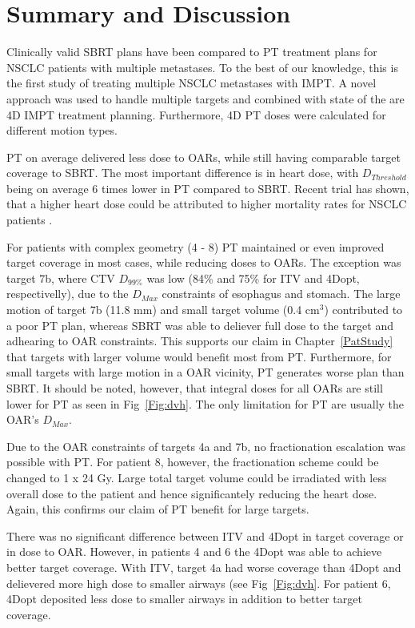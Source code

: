 \documentclass[type=dr, dr=rernat, accentcolor=tud7b,colorbacktitle, bigchapter, openright, twoside, 12pt ]{tudthesis}
\begin{document}
\section{Summary and Discussion}

Clinically valid SBRT plans have been compared to PT treatment plans for NSCLC patients with multiple metastases. 
To the best of our knowledge, this is the first study of treating multiple NSCLC metastases with IMPT. A novel approach was used to handle multiple targets and combined
with state of the are 4D IMPT treatment planning. Furthermore, 4D PT doses were calculated for different motion types. 

PT on average delivered less dose to OARs, while still having comparable target coverage to SBRT.
The most important difference is in heart dose, with $D_{Threshold}$ being on average 6 times lower in PT compared to SBRT. Recent trial has shown,
that a higher heart dose could be attributed to higher mortality rates for NSCLC patients \cite{Bradley2015}.

For patients with complex geometry (4 - 8) PT maintained or even improved target coverage in most cases, while reducing doses to OARs.
The exception was target 7b, where CTV $D_{99\%}$ was low (84\% and 75\% for ITV and 4Dopt, respectivelly), due to the $D_{Max}$ constraints of esophagus and stomach.
The large motion of target 7b (11.8 mm) and small target volume (0.4 cm$^3$) contributed to a poor PT plan, whereas SBRT was able to deliever full dose to the target
and adhearing to OAR constraints. This supports our claim in Chapter~\ref{PatStudy} that targets with larger volume would benefit most from PT. Furthermore, for small targets
with large motion in a OAR vicinity, PT generates worse plan than SBRT. It should be noted, however, that integral doses for all OARs are still lower for PT as seen in Fig~\ref{Fig:dvh}.
The only limitation for PT are usually the OAR's $D_{Max}$.

Due to the OAR constraints of targets 4a and 7b, no fractionation escalation was possible with PT. 
For patient 8, however, the fractionation scheme could be changed to 1 x 24 Gy. Large total target volume could be irradiated with less
overall dose to the patient and hence significantely reducing the heart dose. Again, this confirms our claim of PT benefit for large targets.


There was no significant difference between ITV and 4Dopt in target coverage or in dose to OAR. 
However, in patients 4 and 6 the 4Dopt was able to achieve better target coverage. With ITV, target 4a had worse coverage than 4Dopt and delievered more high dose to 
smaller airways (see Fig~\ref{Fig:dvh}. For patient 6, 4Dopt deposited less dose to smaller airways in addition to better target coverage.
\end{document}
